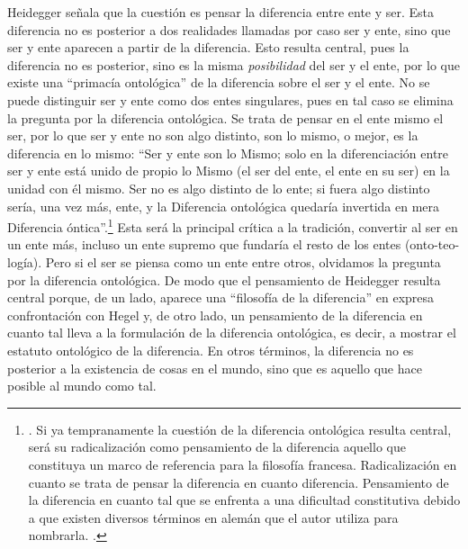 Heidegger señala que la cuestión es pensar la diferencia entre ente y ser. Esta diferencia no es posterior a dos realidades llamadas por caso ser y ente, sino que ser y ente aparecen a partir de la diferencia. Esto resulta central, pues la diferencia no es posterior, sino es la misma \emph{posibilidad} del ser y el ente, por lo que existe una \enquote{primacía ontológica} de la diferencia sobre el ser y el ente. No se puede distinguir ser y ente como dos entes singulares, pues en tal caso se elimina la pregunta por la diferencia ontológica. Se trata de pensar en el ente mismo el ser, por lo que ser y ente no son algo distinto, son lo mismo, o mejor, es la diferencia en lo mismo: \enquote{Ser y ente son lo Mismo; solo en la diferenciación entre ser y ente está unido de propio lo Mismo (el ser del ente, el ente en su ser) en la unidad con él mismo. Ser no es algo distinto de lo ente; si fuera algo distinto sería, una vez más, ente, y la Diferencia ontológica quedaría invertida en mera Diferencia óntica}.\footnote{\cite[176]{@6967-POGGELER1993}. Si ya tempranamente la cuestión de la diferencia ontológica resulta central, será su radicalización como pensamiento de la diferencia aquello que constituya un marco de referencia para la filosofía francesa. Radicalización en cuanto se trata de pensar la diferencia en cuanto diferencia. Pensamiento de la diferencia en cuanto tal que se enfrenta a una dificultad constitutiva debido a que existen diversos términos en alemán que el autor utiliza para nombrarla.  \cite[Véase][]{@6968-RESTA1988}.} Esta será la principal crítica a la tradición, convertir al ser en un ente más, incluso un ente supremo que fundaría el resto de los entes (onto-teo-logía). Pero si el ser se piensa como un ente entre otros, olvidamos la pregunta por la diferencia ontológica. De modo que el pensamiento de Heidegger resulta central porque, de un lado, aparece una \enquote{filosofía de la diferencia} en expresa confrontación con Hegel y, de otro lado, un pensamiento de la diferencia en cuanto tal lleva a la formulación de la diferencia ontológica, es decir, a mostrar el estatuto ontológico de la diferencia. En otros términos, la diferencia no es posterior a la existencia de cosas en el mundo, sino que es aquello que hace posible al mundo como tal.

